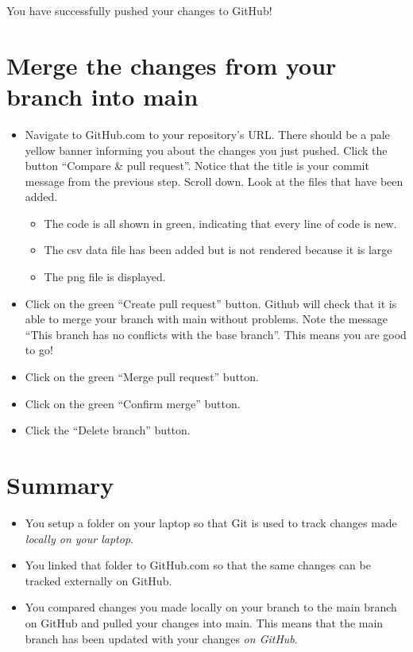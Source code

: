\documentclass[
]{book}
\providecommand{\tightlist}{%
  \setlength{\itemsep}{0pt}\setlength{\parskip}{0pt}}
\begin{document}
You have successfully pushed your changes to GitHub!

\hypertarget{merge-the-changes-from-your-branch-into-main}{%
\section{Merge the changes from your branch into main}\label{merge-the-changes-from-your-branch-into-main}}

\begin{itemize}
\tightlist
\item
  Navigate to GitHub.com to your repository's URL. There should be a pale yellow
  banner informing you about the changes you just pushed. Click the button
  ``Compare \& pull request''. Notice that the title is your commit message from the
  previous step. Scroll down. Look at the files that have been added.

  \begin{itemize}
  \tightlist
  \item
    The code is all shown in green, indicating that every line of code is new.
  \item
    The csv data file has been added but is not rendered because it is large
  \item
    The png file is displayed.
  \end{itemize}
\item
  Click on the green ``Create pull request'' button. Github will check that it
  is able to merge your branch with main without problems. Note the message ``This
  branch has no conflicts with the base branch''. This means you are good to go!
\item
  Click on the green ``Merge pull request'' button.\\
\item
  Click on the green ``Confirm merge'' button.
\item
  Click the ``Delete branch'' button.
\end{itemize}

\hypertarget{summary}{%
\section{Summary}\label{summary}}

\begin{itemize}
\tightlist
\item
  You setup a folder on your laptop so that Git is used to track changes made
  \emph{locally on your laptop}.
\item
  You linked that folder to GitHub.com so that the same changes can be tracked
  externally on GitHub.
\item
  You compared changes you made locally on your branch to the main branch on
  GitHub and pulled your changes into main. This means that the main branch has
  been updated with your changes \emph{on GitHub}.
\end{itemize}
\end{document}
